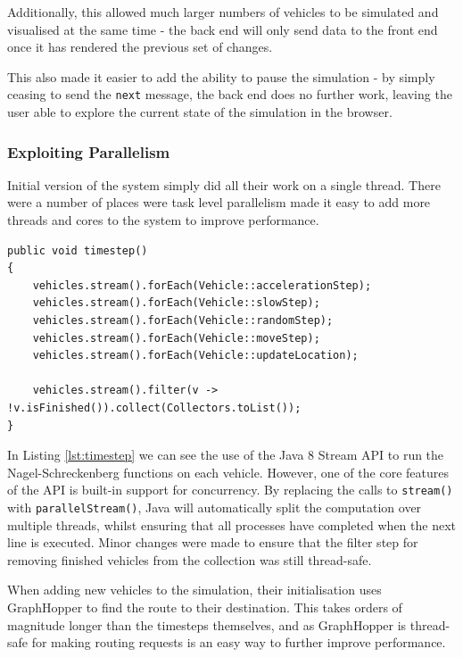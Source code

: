\documentclass[ %
                    author={Alexander Hill},
                supervisor={Dr. Benjamin Sach},
                    degree={MEng},
                     title={MARMOSET},
                  subtitle={Multi-Agent Route Management using Online Simulation for Efficient Transportation},
                      type={research},
                      year={2016} ]{dissertation}
\begin{document}
Additionally, this allowed much larger numbers of vehicles to be simulated and
visualised at the same time - the back end will only send data to the front end
once it has rendered the previous set of changes.

This also made it easier to add the ability to pause the simulation - by simply
ceasing to send the \texttt{next} message, the back end does no further work,
leaving the user able to explore the current state of the simulation in the
browser.

\subsubsection{Exploiting Parallelism}

Initial version of the system simply did all their work on a single thread.
There were a number of places were task level parallelism made it easy to add
more threads and cores to the system to improve performance.

\begin{lstlisting}[caption={The single-threaded \texttt{timestep} function},
    label=lst:timestep]
public void timestep()
{
    vehicles.stream().forEach(Vehicle::accelerationStep);
    vehicles.stream().forEach(Vehicle::slowStep);
    vehicles.stream().forEach(Vehicle::randomStep);
    vehicles.stream().forEach(Vehicle::moveStep);
    vehicles.stream().forEach(Vehicle::updateLocation);

    vehicles.stream().filter(v -> !v.isFinished()).collect(Collectors.toList());
}
\end{lstlisting}

In Listing \ref{lst:timestep} we can see the use of the Java 8 Stream API to run
the Nagel-Schreckenberg functions on each vehicle. However, one of the core
features of the API is built-in support for concurrency. By replacing the calls
to \texttt{stream()} with \texttt{parallelStream()}, Java will automatically
split the computation over multiple threads, whilst ensuring that all processes
have completed when the next line is executed. Minor changes were made to ensure
that the filter step for removing finished vehicles from the collection was
still thread-safe.

When adding new vehicles to the simulation, their initialisation uses
GraphHopper to find the route to their destination. This takes orders of
magnitude longer than the timesteps themselves, and as GraphHopper is
thread-safe for making routing requests is an easy way to further improve
performance.
\end{document}
